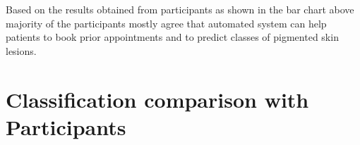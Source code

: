 Based on the results obtained from participants as shown in the bar chart 
above majority of the participants mostly agree that automated system can 
help patients to book prior appointments and to predict classes of pigmented skin lesions.

\pagebreak
\section{Classification comparison with Participants}

